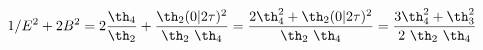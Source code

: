 \begin{equation}
   \begin{split}
   1/E^2 + 2B^2 &= 2 {\th_4 \over \th_2} + {\th_2(0|2\tau)^2
    \over \th_2 ~\th_4} = {2\th_4^2 +\th_2(0|2\tau)^2
    \over \th_2 ~\th_4} =  {3\th_4^2 + \th_3^2  \over 2~\th_2 ~\th_4}
  \end{split}
\end{equation}

